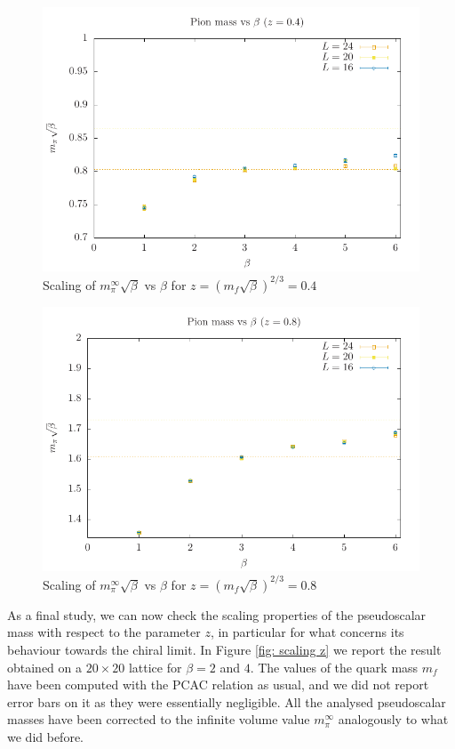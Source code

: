 \begin{figure}
    \centering
    \includegraphics[width=0.8\linewidth]{images/beta04.pdf}
    \caption{Scaling of $m_\pi^{\infty}\sqrt{\beta}$ vs $\beta$ for $z = (m_f \sqrt{\beta})^{2/3} = 0.4$}
    \label{fig: beta z04}
\end{figure}
\begin{figure}
    \centering
    \includegraphics[width=0.8\linewidth]{images/beta08.pdf}
    \caption{Scaling of $m_\pi^{\infty}\sqrt{\beta}$ vs $\beta$ for $z = (m_f \sqrt{\beta})^{2/3} = 0.8$}
    \label{fig: beta z08}
\end{figure}
\newpage
As a final study, we can now check the scaling properties of the pseudoscalar mass with respect to the parameter $z$, in particular for what concerns its behaviour towards the chiral limit. In Figure \eqref{fig: scaling z} we report the result obtained on a $20 \times 20$ lattice for $\beta = 2$ and $4$.
The values of the quark mass $m_f$ have been computed with the PCAC relation as usual, and we did not report error bars on it as they were essentially negligible.
All the analysed pseudoscalar masses have been corrected to the infinite volume value $m_\pi^\infty$ analogously to what we did before.

